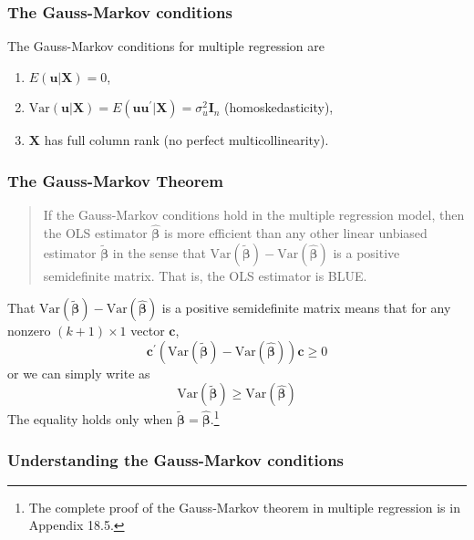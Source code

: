 \documentclass[a4paper,11pt]{article}
\newcommand{\var}{\mathrm{Var}}
\begin{document}
\subsubsection*{The Gauss-Markov conditions}
\label{sec:orga774391}

The Gauss-Markov conditions for multiple regression are
\begin{enumerate}
\item \(E(\mathbf{u} | \mathbf{X}) = 0\),
\item \(\var(\mathbf{u} | \mathbf{X}) = E(\mathbf{uu}^{\prime} |
   \mathbf{X}) = \sigma^2_u \mathbf{I}_n\) (homoskedasticity),
\item \(\mathbf{X}\) has full column rank (no perfect multicollinearity).
\end{enumerate}

\subsubsection*{The Gauss-Markov Theorem}
\label{sec:org40b5cc5}

\begin{quote}
If the Gauss-Markov conditions hold in the multiple regression model,
then the OLS estimator \(\hat{\boldsymbol{\beta}}\) is more efficient
than any other linear unbiased estimator \(\tilde{\boldsymbol{\beta}}\)
in the sense that \(\var(\tilde{\boldsymbol{\beta}}) -
\var(\hat{\boldsymbol{\beta}})\) is a positive semidefinite
matrix. That is, the OLS estimator is BLUE.
\end{quote}

That \(\var(\tilde{\boldsymbol{\beta}}) -
\var(\hat{\boldsymbol{\beta}})\) is a positive semidefinite matrix
means that for any nonzero \((k+1) \times 1\) vector \(\mathbf{c}\),
\[ \mathbf{c}^{\prime}\left(\var(\tilde{\boldsymbol{\beta}}) -
\var(\hat{\boldsymbol{\beta}})\right) \mathbf{c} \geq 0 \]
or we can simply write as
\[ \var(\tilde{\boldsymbol{\beta}}) \geq
\var(\hat{\boldsymbol{\beta}})  \]
The equality holds only when \(\tilde{\boldsymbol{\beta}} =
\hat{\boldsymbol{\beta}}\).\footnote{The complete proof of the Gauss-Markov
theorem in multiple regression is in Appendix 18.5.}

\subsubsection*{Understanding the Gauss-Markov conditions}
\label{sec:org03dff77}
\end{document}
